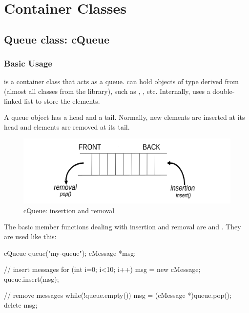 \section{Container Classes}

\subsection{Queue class: cQueue}

\subsubsection{Basic Usage}


 is a container class that acts as a queue.
 can hold objects of type derived from 
(almost all classes from the {\opp} library), such as
, , etc. Internally, 
uses a double-linked list to store the elements.

A queue object has a head and a tail. Normally, new elements
are inserted at its head and elements are removed at its tail.


\begin{figure}[htbp]
  \begin{center}
    \includegraphics{figures/simlib-queue}
    \caption{cQueue: insertion and removal}
    \label{fig:ch-sim-lib:cqueue}
  \end{center}
\end{figure}

The basic  member functions dealing with insertion and removal
are  and . They are used
like this:

\begin{cpp}
cQueue queue("my-queue");
cMessage *msg;

// insert messages
for (int i=0; i<10; i++)
{
  msg = new cMessage;
  queue.insert(msg);
}

// remove messages
while(!queue.empty())
{
  msg = (cMessage *)queue.pop();
  delete msg;
}
\end{cpp}



